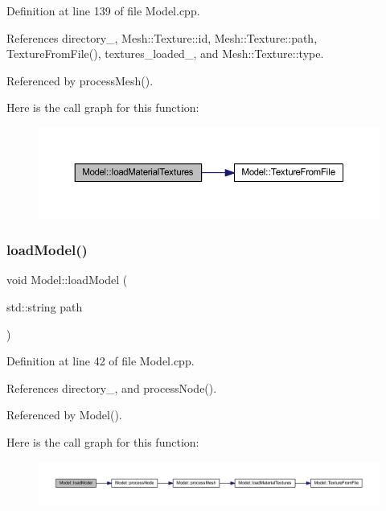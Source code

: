 Definition at line 139 of file Model.\+cpp.



References directory\+\_\+, Mesh\+::\+Texture\+::id, Mesh\+::\+Texture\+::path, Texture\+From\+File(), textures\+\_\+loaded\+\_\+, and Mesh\+::\+Texture\+::type.



Referenced by process\+Mesh().

Here is the call graph for this function\+:\nopagebreak
\begin{figure}[H]
\begin{center}
\leavevmode
\includegraphics[width=350pt]{classModel_aa7d0215f3ee74bef71ddeef173dd36dd_cgraph}
\end{center}
\end{figure}
\mbox{\label{classModel_a3cd88224a93dc81a8503d42be807eb86}} 
\subsubsection{\texorpdfstring{load\+Model()}{loadModel()}}
{\footnotesize\ttfamily void Model\+::load\+Model (\begin{DoxyParamCaption}\item[{std\+::string}]{path }\end{DoxyParamCaption})\hspace{0.3cm}{\ttfamily [protected]}}



Definition at line 42 of file Model.\+cpp.



References directory\+\_\+, and process\+Node().



Referenced by Model().

Here is the call graph for this function\+:\nopagebreak
\begin{figure}[H]
\begin{center}
\leavevmode
\includegraphics[width=350pt]{classModel_a3cd88224a93dc81a8503d42be807eb86_cgraph}
\end{center}
\end{figure}
\mbox{\label{classModel_a95ae1a9980ded3d98b1c8785cb889d96}} 
